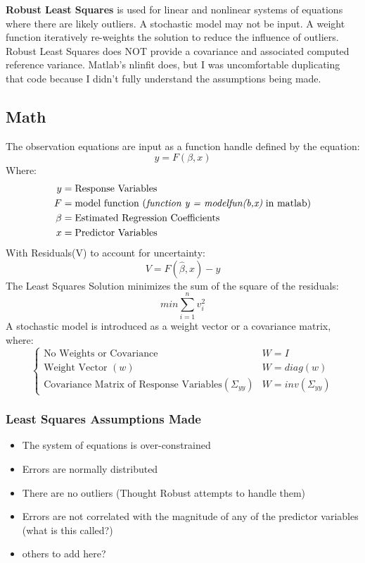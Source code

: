 \documentclass{article}
\begin{document}
	\textbf{Robust Least Squares} is used for linear and nonlinear systems of equations where there are likely outliers.  A stochastic model may not be input.  A weight function iteratively re-weights the solution to reduce the influence of outliers.  Robust Least Squares does NOT provide a covariance and associated computed reference variance.  Matlab's nlinfit does, but I was uncomfortable duplicating that code because I didn't fully understand the assumptions being made.  
	
	\clearpage
	\subsection{Math}
	The observation equations are input as a function handle defined by the equation:
	\[
	y= F(\beta,x)
	\]
	Where:
	\begin{align*}
	y &= \text{Response Variables} \\
	F &= \text{model function (\textit{function y = modelfun(b,x)} in matlab)} \\
	\beta &= \text{Estimated Regression Coefficients} \\
	x &= \text{Predictor Variables}
	\end{align*}
	With Residuals(V) to account for uncertainty:
	\[
	V = F(\hat{\beta},x) - y
	\]
	The Least Squares Solution minimizes the sum of the square of the residuals:
	\[
	min\sum\limits_{i=1}^n v_i^2
	\]
	A stochastic model is introduced as a weight vector or a covariance matrix, where:
	\[
	\begin{cases}
	\text{No Weights or Covariance} & W = I \\
	\text{Weight Vector } (w) & W = diag(w)  \\
	\text{Covariance Matrix of Response Variables}(\Sigma_{yy}) & W = inv(\Sigma_{yy})
	\end{cases}
	\]
	\subsubsection*{Least Squares Assumptions Made}
	\begin{itemize}
		\item The system of equations is over-constrained
		\item Errors are normally distributed
		\item There are no outliers (Thought Robust attempts to handle them)
		\item Errors are not correlated with the magnitude of any of the predictor variables (what is this called?)
		\item others to add here? 
	\end{itemize}
\end{document}
